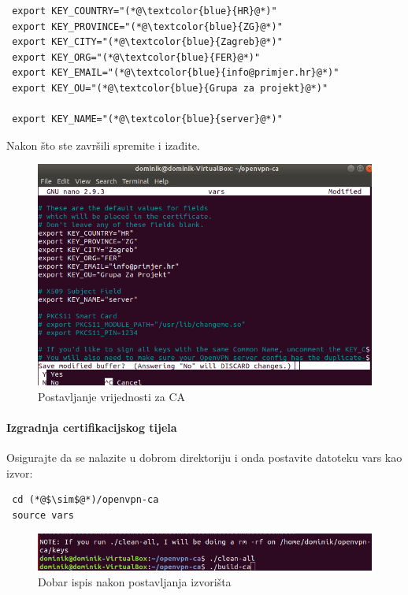 \begin{lstlisting}
 export KEY_COUNTRY="(*@\textcolor{blue}{HR}@*)"
 export KEY_PROVINCE="(*@\textcolor{blue}{ZG}@*)"
 export KEY_CITY="(*@\textcolor{blue}{Zagreb}@*)"
 export KEY_ORG="(*@\textcolor{blue}{FER}@*)"
 export KEY_EMAIL="(*@\textcolor{blue}{info@primjer.hr}@*)"
 export KEY_OU="(*@\textcolor{blue}{Grupa za projekt}@*)"

 export KEY_NAME="(*@\textcolor{blue}{server}@*)"
\end{lstlisting}
 Nakon što ste završili spremite i izađite. 

 \begin{figure}[h]
 	\centering
 	\includegraphics[width=0.7\linewidth]{"slike/OpenVPN/Screenshot from 2018-12-14 18-30-43"}
 	\caption[Postavljanje vrijednosti za certifikacijsko tijelo]{Postavljanje vrijednosti za CA}
 	\label{fig:screenshot-from-2018-12-14-18-30-43}
 \end{figure}
 
\bigbreak
\paragraph*{Izgradnja certifikacijskog tijela}
\hfill \smallbreak
Osigurajte da se nalazite u dobrom direktoriju i onda postavite datoteku vars kao izvor:
\begin{lstlisting}
 cd (*@$\sim$@*)/openvpn-ca
 source vars
\end{lstlisting}

\begin{figure}[h]
	\centering
	\includegraphics[width=0.7\linewidth]{"slike/OpenVPN/Screenshot from 2018-12-14 18-32-06"}
	\caption[Dobar ispis nakon postavljanja izvorišta]{Dobar ispis nakon postavljanja izvorišta}
	\label{fig:screenshot-from-2018-12-14-18-32-06}
\end{figure}


